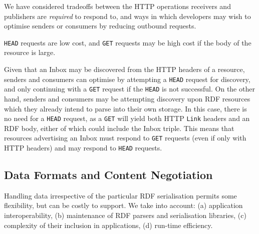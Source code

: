 \documentclass[a4paper]{llncs}
\begin{document}
\par We have considered tradeoffs between the HTTP operations receivers and publishers are {\em required} to respond to, and ways in which developers may wish to optimise senders or consumers by reducing outbound requests.

                                    
\par 
                                        
                                        {\tt HEAD} requests are low cost, and {\tt GET} requests may be high cost if the body of the resource is large.

                                        Given that an Inbox may be discovered from the HTTP headers of a resource, senders and consumers can optimise by attempting a {\tt HEAD} request for discovery, and only continuing with a {\tt GET} request if the {\tt HEAD} is not successful. On the other hand, senders and consumers may be attempting discovery upon RDF resources which they already intend to parse into their own storage. In this case, there is no need for a {\tt HEAD} request, as a {\tt GET} will yield both HTTP {\tt Link} headers and an RDF body, either of which could include the Inbox triple. This means that resources advertising an Inbox must respond to {\tt GET} requests (even if only with HTTP headers) and may respond to {\tt HEAD} requests.
                                    
                                
                            

                            
                                \subsection{Data Formats and Content Negotiation}
  \label{data-formats}

                                
                                    
\par Handling data irrespective of the particular RDF serialisation permits some flexibility, but can be costly to support. We take into account: (a) application interoperability, (b) maintenance of RDF parsers and serialisation libraries, (c) complexity of their inclusion in applications, (d) run-time efficiency.

                                    
\par 
                                        
\end{document}
